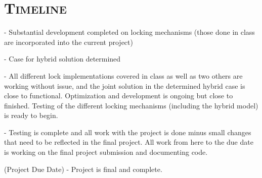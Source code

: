 \documentclass[finalProject.tex]{subfiles}
\begin{document}
\bigskip

\section*{\textsc{\Large Timeline}}

 - Substantial development completed on locking mechanisms (those done in class are incorporated into the current project)

\smallskip

 - Case for hybrid solution determined

 - All different lock implementations covered in class as well as two others are working without issue, and the joint solution in the determined hybrid case is close to functional. Optimization and development is ongoing but close to finished. Testing of the different locking mechanisms (including the hybrid model) is ready to begin.

\smallskip

 - Testing is complete and all work with the project is done minus small changes that need to be reflected in the final project. All work from here to the due date is working on the final project submission and documenting code. 

\smallskip

 (Project Due Date) - Project is final and complete.
\end{document}
